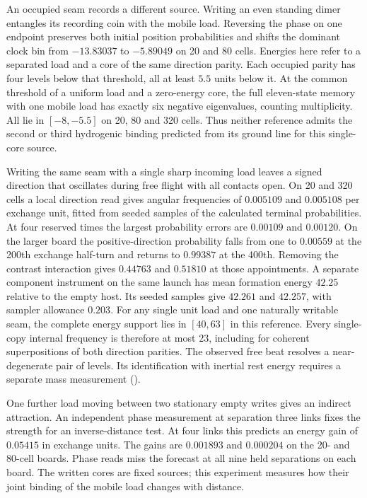 \documentclass[11pt]{article}
\theoremstyle{definition}
\theoremstyle{remark}
\theoremstyle{plain}
\begin{document}
An occupied seam records a different source. Writing an even standing
dimer entangles its recording coin with the mobile load. Reversing the
phase on one endpoint preserves both initial position probabilities
and shifts the dominant clock bin from $-13.83037$ to $-5.89049$ on
20 and 80 cells. Energies here refer to a separated load and a core of
the same direction parity. Each occupied parity has four levels below
that threshold, all at least $5.5$ units below it. At the common
threshold of a uniform load and a zero-energy core, the full eleven-state
memory with one mobile load has exactly six negative eigenvalues,
counting multiplicity. All lie in $[-8,-5.5]$ on 20, 80 and 320 cells.
Thus neither reference admits the second or third hydrogenic binding
predicted from its ground line for this single-core source.

Writing the same seam with a single sharp incoming load leaves a signed
direction that oscillates during free flight with all contacts open.
On 20 and 320 cells a local direction read gives angular frequencies of
$0.005109$ and $0.005108$ per exchange unit, fitted from seeded samples
of the calculated terminal probabilities. At four reserved times the
largest probability errors are $0.00109$ and $0.00120$. On the larger
board the positive-direction probability falls from one to $0.00559$
at the 200th exchange half-turn and returns to $0.99387$ at the 400th.
Removing the contrast interaction gives $0.44763$ and $0.51810$ at
those appointments. A separate component instrument on the same launch
has mean formation energy $42.25$ relative to the empty host. Its seeded
samples give $42.261$ and $42.257$, with sampler allowance $0.203$.
For any single unit load and one naturally writable seam, the complete
energy support lies in $[40,63]$ in this reference. Every single-copy
internal frequency is therefore at most $23$, including for coherent
superpositions of both direction parities. The observed free beat
resolves a near-degenerate pair of levels. Its identification with
inertial rest energy requires a separate mass measurement
().

One further load moving between two stationary empty writes gives an
indirect attraction. An independent phase measurement at separation
three links fixes the strength for an inverse-distance test. At four
links this predicts an energy gain of $0.05415$ in exchange units.
The gains are $0.001893$ and $0.000204$ on the 20- and 80-cell
boards. Phase reads miss the forecast at all nine held separations
on each board. The written cores are fixed sources; this experiment
measures how their joint binding of the mobile load changes with
distance.
\end{document}
